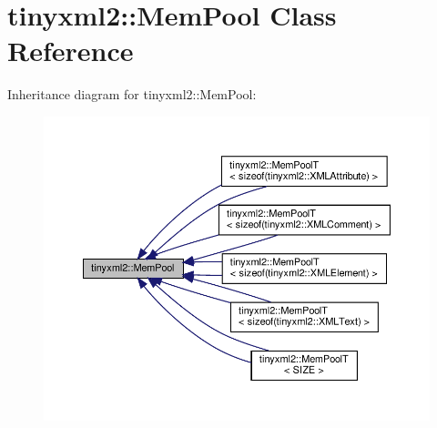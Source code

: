 \hypertarget{classtinyxml2_1_1MemPool}{}\section{tinyxml2\+:\+:Mem\+Pool Class Reference}
\label{classtinyxml2_1_1MemPool}


Inheritance diagram for tinyxml2\+:\+:Mem\+Pool\+:
\nopagebreak
\begin{figure}[H]
\begin{center}
\leavevmode
\includegraphics[width=350pt]{classtinyxml2_1_1MemPool__inherit__graph}
\end{center}
\end{figure}
